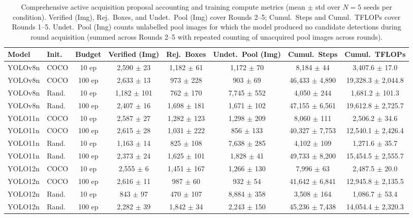 \begin{table}[hbt!]
\caption{Comprehensive active acquisition proposal accounting and training compute metrics (mean $\pm$ std over $N=5$ seeds per condition). Verified (Img), Rej.\ Boxes, and Undet.\ Pool (Img) cover Rounds 2--5; Cumul.\ Steps and Cumul.\ TFLOPs cover Rounds 1--5. Undet.\ Pool (Img) counts unlabelled pool images for which the model produced no candidate detections during round acquisition (summed across Rounds 2--5 with repeated counting of unacquired pool images across rounds).}%
\label{tab:supp_compute_accounting}
\centering
\scriptsize
\setlength{\tabcolsep}{1.2pt}
\begin{tabular}{llcccccc}
\toprule
\textbf{Model} & \textbf{Init.} & \textbf{Budget} & \textbf{Verified (Img)} & \textbf{Rej.\ Boxes} & \textbf{Undet.\ Pool (Img)} & \textbf{Cumul.\ Steps} & \textbf{Cumul.\ TFLOPs} \\
\midrule
YOLOv8n & COCO & 10 ep & 2,590 $\pm$ 23 & 1,182 $\pm$ 61 & 1,172 $\pm$ 70 & 8,184 $\pm$ 44 & 3,407.6 $\pm$ 17.0 \\
YOLOv8n & COCO & 100 ep & 2,633 $\pm$ 13 & 973 $\pm$ 228 & 903 $\pm$ 69 & 46,433 $\pm$ 4,890 & 19,328.3 $\pm$ 2,044.8 \\
YOLOv8n & Rand. & 10 ep & 1,182 $\pm$ 101 & 762 $\pm$ 170 & 7,745 $\pm$ 552 & 4,050 $\pm$ 244 & 1,681.2 $\pm$ 101.3 \\
YOLOv8n & Rand. & 100 ep & 2,407 $\pm$ 16 & 1,698 $\pm$ 181 & 1,671 $\pm$ 102 & 47,155 $\pm$ 6,561 & 19,612.8 $\pm$ 2,725.7 \\
\midrule
YOLO11n & COCO & 10 ep & 2,587 $\pm$ 27 & 1,282 $\pm$ 123 & 1,298 $\pm$ 209 & 8,060 $\pm$ 111 & 2,506.2 $\pm$ 34.6 \\
YOLO11n & COCO & 100 ep & 2,615 $\pm$ 28 & 1,031 $\pm$ 222 & 856 $\pm$ 133 & 40,327 $\pm$ 7,753 & 12,540.1 $\pm$ 2,426.4 \\
YOLO11n & Rand. & 10 ep & 1,163 $\pm$ 14 & 825 $\pm$ 108 & 7,638 $\pm$ 285 & 4,102 $\pm$ 109 & 1,271.6 $\pm$ 35.7 \\
YOLO11n & Rand. & 100 ep & 2,373 $\pm$ 24 & 1,625 $\pm$ 101 & 1,828 $\pm$ 41 & 49,733 $\pm$ 8,200 & 15,454.5 $\pm$ 2,555.7 \\
\midrule
YOLO12n & COCO & 10 ep & 2,555 $\pm$ 6 & 1,451 $\pm$ 167 & 1,266 $\pm$ 130 & 7,996 $\pm$ 63 & 2,487.5 $\pm$ 20.0 \\
YOLO12n & COCO & 100 ep & 2,616 $\pm$ 11 & 987 $\pm$ 60 & 932 $\pm$ 54 & 41,642 $\pm$ 6,841 & 12,945.8 $\pm$ 2,135.5 \\
YOLO12n & Rand. & 10 ep & 843 $\pm$ 97 & 470 $\pm$ 107 & 8,884 $\pm$ 358 & 3,508 $\pm$ 164 & 1,086.7 $\pm$ 53.4 \\
YOLO12n & Rand. & 100 ep & 2,282 $\pm$ 39 & 1,842 $\pm$ 34 & 2,243 $\pm$ 150 & 45,236 $\pm$ 7,438 & 14,054.4 $\pm$ 2,320.3 \\
\bottomrule
\end{tabular}
\end{table}
